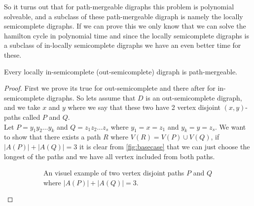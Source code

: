 So it turns out that for path-mergeable digraphs this problem is polynomial solveable, and a subclass of these path-mergeable digraph is namely the locally semicomplete digraphs. 
If we can prove this we only know that we can solve the hamilton cycle in polynomial time and since the locally semicomplete digraphs is a subclass of in-locally semicomplete digraphs we have an even better time for these.
\begin{prop}
    Every locally in-semicomplete (out-semicomplete) digraph is path-mergeable.
\end{prop}
\begin{proof}
    First we prove its true for out-semicomplete and there after for in-semicomplete digraphs.
    So lets assume that $D$ is an out-semicomplete digraph, and we take $x$ and $y$ where we say that these two have 2 vertex disjoint $(x,y)$-paths called $P$ and $Q$.\\
    Let $P=y_1y_2\dots y_k$ and $Q=z_1z_2\dots z_s$ where $y_1=x=z_1$ and $y_k=y=z_s$. We want to show that there exists a path $R$ where $V(R)=V(P)\cup V(Q)$, if $|A(P)|+|A(Q)|=3$ it is clear from \autoref{fig:basecase} that we can just choose the longest of the paths and we have all vertex included from both paths.
    \begin{figure}
        \centering
        \begin{subfigure}{0.36\textwidth}
            \centering
            \caption{An visuel example of two vertex disjoint paths $P$ and $Q$ where $|A(P)|+|A(Q)|=3$.}
            \label{fig:basecase}
        \end{subfigure}\hfill
        \begin{subfigure}{0.60\textwidth}
            \centering
\end{subfigure}
\end{figure}
\end{proof}
